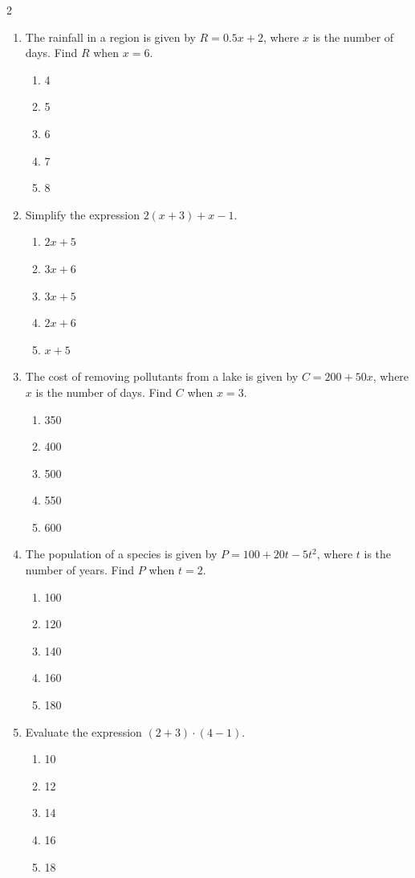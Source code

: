 \documentclass[10pt]{article}
\begin{document}
\begin{multicols}{2}
\begin{enumerate}[label=\textbf{Q\arabic*.}, leftmargin=*, itemsep=6pt, parsep=0pt]
  \item \small The rainfall in a region is given by $R = 0.5x + 2$, where $x$ is the number of days. Find $R$ when $x = 6$.
  \begin{enumerate}[label=(\Alph*), leftmargin=0.6cm, nosep, itemsep=2pt]
    \item 4
    \item 5
    \item 6
    \item 7
    \item 8
  \end{enumerate}

  \item \small Simplify the expression $2(x + 3) + x - 1$.
  \begin{enumerate}[label=(\Alph*), leftmargin=0.6cm, nosep, itemsep=2pt]
    \item $2x + 5$
    \item $3x + 6$
    \item $3x + 5$
    \item $2x + 6$
    \item $x + 5$
  \end{enumerate}

  \item \small The cost of removing pollutants from a lake is given by $C = 200 + 50x$, where $x$ is the number of days. Find $C$ when $x = 3$.
  \begin{enumerate}[label=(\Alph*), leftmargin=0.6cm, nosep, itemsep=2pt]
    \item 350
    \item 400
    \item 500
    \item 550
    \item 600
  \end{enumerate}

  \item \small The population of a species is given by $P = 100 + 20t - 5t^2$, where $t$ is the number of years. Find $P$ when $t = 2$.
  \begin{enumerate}[label=(\Alph*), leftmargin=0.6cm, nosep, itemsep=2pt]
    \item 100
    \item 120
    \item 140
    \item 160
    \item 180
  \end{enumerate}

  \item \small Evaluate the expression $(2 + 3) \cdot (4 - 1)$.
  \begin{enumerate}[label=(\Alph*), leftmargin=0.6cm, nosep, itemsep=2pt]
    \item 10
    \item 12
    \item 14
    \item 16
    \item 18
  \end{enumerate}


\end{enumerate}
\end{multicols}
\end{document}
